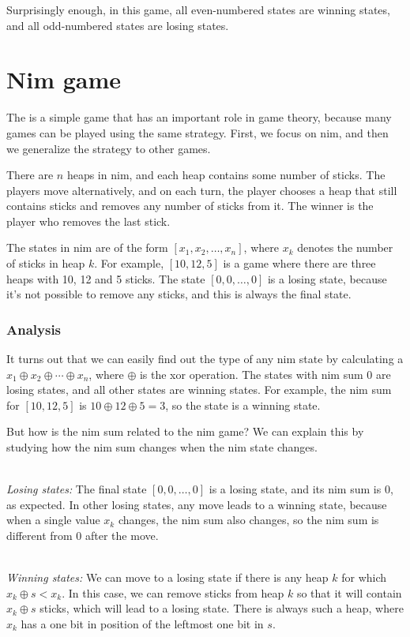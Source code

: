 Surprisingly enough, in this game,
all even-numbered states are winning states,
and all odd-numbered states are losing states.

\section{Nim game}


The  is a simple game that
has an important role in game theory,
because many games can be played using
the same strategy.
First, we focus on nim,
and then we generalize the strategy
to other games.

There are $n$ heaps in nim,
and each heap contains some number of sticks.
The players move alternatively,
and on each turn, the player chooses
a heap that still contains sticks
and removes any number of sticks from it.
The winner is the player who removes the last stick.

The states in nim are of the form
$[x_1,x_2,\ldots,x_n]$,
where $x_k$ denotes the number of sticks in heap $k$.
For example, $[10,12,5]$ is a game where
there are three heaps with 10, 12 and 5 sticks.
The state $[0,0,\ldots,0]$ is a losing state,
because it's not possible to remove any sticks,
and this is always the final state.

\subsubsection{Analysis}

It turns out that we can easily find out
the type of any nim state by calculating
a  $x_1 \oplus x_2 \oplus \cdots \oplus x_n$,
where $\oplus$ is the xor operation.
The states with nim sum 0 are losing states,
and all other states are winning states.
For example, the nim sum for
$[10,12,5]$ is $10 \oplus 12 \oplus 5 = 3$,
so the state is a winning state.

But how is the nim sum related to the nim game?
We can explain this by studying how the nim
sum changes when the nim state changes.

~\\
\noindent
\textit{Losing states:}
The final state $[0,0,\ldots,0]$ is a losing state,
and its nim sum is 0, as expected.
In other losing states, any move leads to
a winning state, because when a single value $x_k$ changes,
the nim sum also changes, so the nim sum
is different from 0 after the move.

~\\
\noindent
\textit{Winning states:}
We can move to a losing state if
there is any heap $k$ for which $x_k \oplus s < x_k$.
In this case, we can remove sticks from
heap $k$ so that it will contain $x_k \oplus s$ sticks,
which will lead to a losing state.
There is always such a heap, where $x_k$
has a one bit in position of the leftmost
one bit in $s$.

